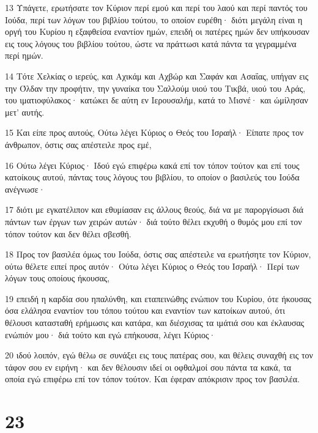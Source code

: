 \par 13 Υπάγετε, ερωτήσατε τον Κύριον περί εμού και περί του λαού και περί παντός του Ιούδα, περί των λόγων του βιβλίου τούτου, το οποίον ευρέθη· διότι μεγάλη είναι η οργή του Κυρίου η εξαφθείσα εναντίον ημών, επειδή οι πατέρες ημών δεν υπήκουσαν εις τους λόγους του βιβλίου τούτου, ώστε να πράττωσι κατά πάντα τα γεγραμμένα περί ημών.
\par 14 Τότε Χελκίας ο ιερεύς, και Αχικάμ και Αχβώρ και Σαφάν και Ασαΐας, υπήγαν εις την Όλδαν την προφήτιν, την γυναίκα του Σαλλούμ υιού του Τικβά, υιού του Αράς, του ιματιοφύλακος· κατώκει δε αύτη εν Ιερουσαλήμ, κατά το Μισνέ· και ώμίλησαν μετ' αυτής.
\par 15 Και είπε προς αυτούς, Ούτω λέγει Κύριος ο Θεός του Ισραήλ· Είπατε προς τον άνθρωπον, όστις σας απέστειλε προς εμέ,
\par 16 Ούτω λέγει Κύριος· Ιδού εγώ επιφέρω κακά επί τον τόπον τούτον και επί τους κατοίκους αυτού, πάντας τους λόγους του βιβλίου, το οποίον ο βασιλεύς του Ιούδα ανέγνωσε·
\par 17 διότι με εγκατέλιπον και εθυμίασαν εις άλλους θεούς, διά να με παροργίσωσι διά πάντων των έργων των χειρών αυτών· διά τούτο θέλει εκχυθή ο θυμός μου επί τον τόπον τούτον και δεν θέλει σβεσθή.
\par 18 Προς τον βασιλέα όμως του Ιούδα, όστις σας απέστειλε να ερωτήσητε τον Κύριον, ούτω θέλετε ειπεί προς αυτόν· Ούτω λέγει Κύριος ο Θεός του Ισραήλ· Περί των λόγων τους οποίους ήκουσας,
\par 19 επειδή η καρδία σου ηπαλύνθη, και εταπεινώθης ενώπιον του Κυρίου, ότε ήκουσας όσα ελάλησα εναντίον του τόπου τούτου και εναντίον των κατοίκων αυτού, ότι θέλουσι κατασταθή ερήμωσις και κατάρα, και διέσχισας τα ιμάτιά σου και έκλαυσας ενώπιόν μου· διά τούτο και εγώ επήκουσα, λέγει Κύριος·
\par 20 ιδού λοιπόν, εγώ θέλω σε συνάξει εις τους πατέρας σου, και θέλεις συναχθή εις τον τάφον σου εν ειρήνη· και δεν θέλουσιν ιδεί οι οφθαλμοί σου πάντα τα κακά, τα οποία εγώ επιφέρω επί τον τόπον τούτον. Και έφεραν απόκρισιν προς τον βασιλέα.

\chapter{23}

